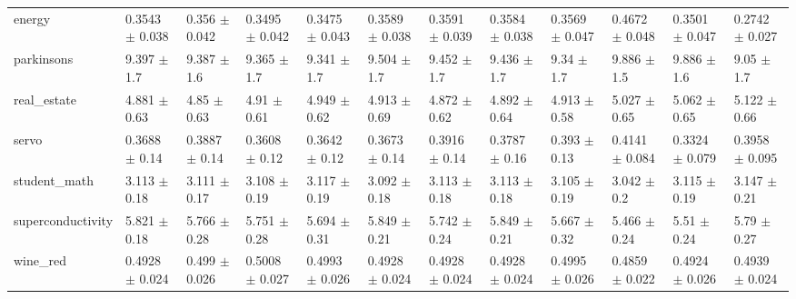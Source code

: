 \begin{tabular}{llllllllllll}
energy & 0.3543 $\pm$ 0.038 & 0.356 $\pm$ 0.042 & 0.3495 $\pm$ 0.042 & 0.3475 $\pm$ 0.043 & 0.3589 $\pm$ 0.038 & 0.3591 $\pm$ 0.039 & 0.3584 $\pm$ 0.038 & 0.3569 $\pm$ 0.047 & 0.4672 $\pm$ 0.048 & 0.3501 $\pm$ 0.047 & 0.2742 $\pm$ 0.027 \\
parkinsons & 9.397 $\pm$ 1.7 & 9.387 $\pm$ 1.6 & 9.365 $\pm$ 1.7 & 9.341 $\pm$ 1.7 & 9.504 $\pm$ 1.7 & 9.452 $\pm$ 1.7 & 9.436 $\pm$ 1.7 & 9.34 $\pm$ 1.7 & 9.886 $\pm$ 1.5 & 9.886 $\pm$ 1.6 & 9.05 $\pm$ 1.7 \\
real\_estate & 4.881 $\pm$ 0.63 & 4.85 $\pm$ 0.63 & 4.91 $\pm$ 0.61 & 4.949 $\pm$ 0.62 & 4.913 $\pm$ 0.69 & 4.872 $\pm$ 0.62 & 4.892 $\pm$ 0.64 & 4.913 $\pm$ 0.58 & 5.027 $\pm$ 0.65 & 5.062 $\pm$ 0.65 & 5.122 $\pm$ 0.66 \\
servo & 0.3688 $\pm$ 0.14 & 0.3887 $\pm$ 0.14 & 0.3608 $\pm$ 0.12 & 0.3642 $\pm$ 0.12 & 0.3673 $\pm$ 0.14 & 0.3916 $\pm$ 0.14 & 0.3787 $\pm$ 0.16 & 0.393 $\pm$ 0.13 & 0.4141 $\pm$ 0.084 & 0.3324 $\pm$ 0.079 & 0.3958 $\pm$ 0.095 \\
student\_math & 3.113 $\pm$ 0.18 & 3.111 $\pm$ 0.17 & 3.108 $\pm$ 0.19 & 3.117 $\pm$ 0.19 & 3.092 $\pm$ 0.18 & 3.113 $\pm$ 0.18 & 3.113 $\pm$ 0.18 & 3.105 $\pm$ 0.19 & 3.042 $\pm$ 0.2 & 3.115 $\pm$ 0.19 & 3.147 $\pm$ 0.21 \\
superconductivity & 5.821 $\pm$ 0.18 & 5.766 $\pm$ 0.28 & 5.751 $\pm$ 0.28 & 5.694 $\pm$ 0.31 & 5.849 $\pm$ 0.21 & 5.742 $\pm$ 0.24 & 5.849 $\pm$ 0.21 & 5.667 $\pm$ 0.32 & 5.466 $\pm$ 0.24 & 5.51 $\pm$ 0.24 & 5.79 $\pm$ 0.27 \\
wine\_red & 0.4928 $\pm$ 0.024 & 0.499 $\pm$ 0.026 & 0.5008 $\pm$ 0.027 & 0.4993 $\pm$ 0.026 & 0.4928 $\pm$ 0.024 & 0.4928 $\pm$ 0.024 & 0.4928 $\pm$ 0.024 & 0.4995 $\pm$ 0.026 & 0.4859 $\pm$ 0.022 & 0.4924 $\pm$ 0.026 & 0.4939 $\pm$ 0.024 \\
\bottomrule
\end{tabular}
